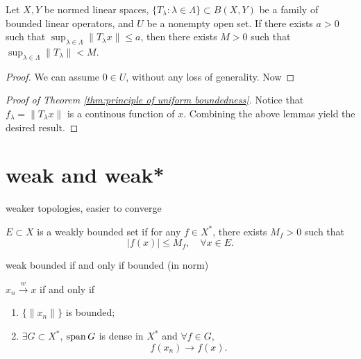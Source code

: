 \begin{lemma}
    Let $X,Y$ be normed linear spaces, $\{T_\lambda:\lambda\in\Lambda\}\subset B(X,Y)$ be a family of bounded linear operators, and $U$ be a nonempty open set.
    If there exists $a>0$ such that $\sup_{\lambda\in\Lambda}\|T_\lambda x\|\leq a$, then there exists $M>0$ such that $\sup_{\lambda\in\Lambda}\|T_\lambda \|<M$.
\end{lemma}
\begin{proof}
    We can assume $0\in U$, without any loss of generality. Now 
\end{proof}

\begin{proof}[Proof of Theorem \ref{thm:principle of uniform boundedness}]
    Notice that $f_\lambda=\|T_\lambda x\|$ is a continous function of $x$. Combining the above lemmas yield the desired result.
\end{proof}

\begin{corollary}
    
\end{corollary}

\section{weak and weak*}

weaker topologies, easier to converge 

\begin{definition}
    $E\subset X$ is a weakly bounded set if 
    for any $f\in X^*$, there exists $M_f>0$ such that 
    $$ |f(x)|\leq M_f,\quad \forall x\in E. $$
\end{definition}

\begin{theorem}
    weak bounded if and only if bounded (in norm)
\end{theorem}

\begin{theorem}
    $x_n\overset{w}{\to} x$ if and only if 
    \begin{enumerate}[label=(\roman*)]
        \item $\{\|x_n\|\}$ is bounded;
        \item $\exists G\subset X^*$, $\operatorname{span} G$ is dense in $X^*$ and $\forall f\in G$, $$f(x_n)\to f(x).$$
    \end{enumerate}
\end{theorem}

